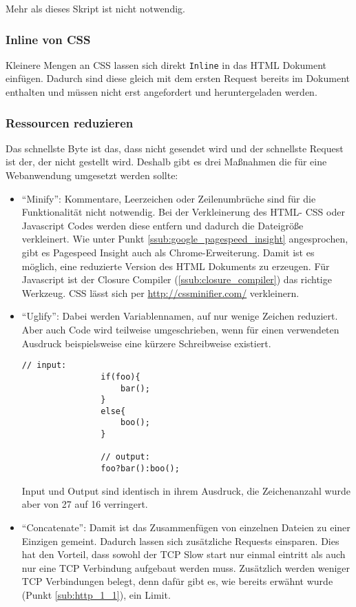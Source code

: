 			Mehr als dieses Skript ist nicht notwendig.
				

		\subsubsection{Inline von CSS} %
		\label{ssub:inline_von_css}
			Kleinere Mengen an CSS lassen sich direkt \texttt{Inline} in das HTML Dokument einfügen. Dadurch sind diese gleich mit dem ersten Request bereits im Dokument enthalten und müssen nicht erst angefordert und heruntergeladen werden.

		\subsubsection{Ressourcen reduzieren} %
		\label{ssub:ressourcen_reduzieren}
			Das schnellste Byte ist das, dass nicht gesendet wird und der schnellste Request ist der, der nicht gestellt wird. Deshalb gibt es drei Maßnahmen die für eine Webanwendung umgesetzt werden sollte:

			\begin{itemize}
				\item "`Minify"': Kommentare, Leerzeichen oder Zeilenumbrüche sind für die Funktionalität nicht notwendig. Bei der Verkleinerung des HTML- CSS oder Javascript Codes werden diese entfern und dadurch die Dateigröße verkleinert. Wie unter Punkt \ref{ssub:google_pagespeed_insight} angesprochen, gibt es Pagespeed Insight auch als Chrome-Erweiterung. Damit ist es möglich, eine reduzierte Version des HTML Dokuments zu erzeugen. Für Javascript ist der Closure Compiler (\ref{ssub:closure_compiler}) das richtige Werkzeug. CSS lässt sich per \url{http://cssminifier.com/} verkleinern.
				\item "`Uglify"': Dabei werden Variablennamen, auf nur wenige Zeichen reduziert. Aber auch Code wird teilweise umgeschrieben, wenn für einen verwendeten Ausdruck beispielsweise eine kürzere Schreibweise existiert.

				\begin{lstlisting}[captionpos=b, caption=Beispiel: Uglify eines Ausdrucks, label=lst:uglify]
				// input:
				if(foo){
					bar();
				}
				else{
					boo();
				}

				// output:
				foo?bar():boo();
				\end{lstlisting}

				Input und Output sind identisch in ihrem Ausdruck, die Zeichenanzahl wurde aber von 27 auf 16 verringert.

				\item "`Concatenate"': Damit ist das Zusammenfügen von einzelnen Dateien zu einer Einzigen gemeint. Dadurch lassen sich zusätzliche Requests einsparen. Dies hat den Vorteil, dass sowohl der TCP Slow start nur einmal eintritt als auch nur eine TCP Verbindung aufgebaut werden muss. Zusätzlich werden weniger TCP Verbindungen belegt, denn dafür gibt es, wie bereits erwähnt wurde (Punkt \ref{sub:http_1_1}), ein Limit.
			\end{itemize}

